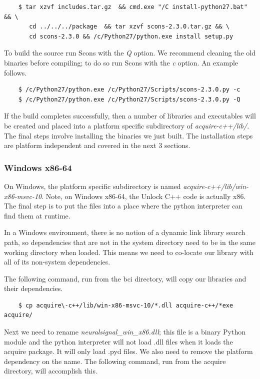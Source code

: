 \documentclass[11pt]{article}
\begin{document}
\begin{verbatim}
    $ tar xzvf includes.tar.gz  && cmd.exe "/C install-python27.bat"  && \ 
       cd ../../../package  && tar xzvf scons-2.3.0.tar.gz && \
       cd scons-2.3.0 && /c/Python27/python.exe install setup.py  
\end{verbatim}

To build the source run Scons with the \textit{\-Q} option. We recommend cleaning the old binaries before compiling; to do so run Scons with the \textit{\-c} option.  An example follows.
\begin{verbatim}
    $ /c/Python27/python.exe /c/Python27/Scripts/scons-2.3.0.py -c 
    $ /c/Python27/python.exe /c/Python27/Scripts/scons-2.3.0.py -Q
\end{verbatim}

If the build completes successfully, then a number of libraries and executables will be created and placed into a platform specific subdirectory of \textit{acquire-c++/lib/}.  The final steps involve installing the binaries we just built.  The installation steps are platform independent and covered in the next 3 sections.

\subsubsection{Windows x86-64}

On Windows, the platform specific subdirectory is named \textit{acquire-c++/lib/win-x86-msvc-10}.  Note, on Windows x86-64, the Unlock C++ code is actually x86.  The final step is to put the files into a place where the python interpreter can find them at runtime.

In a Windows environment, there is no notion of a dynamic link library search path, so dependencies that are not in the system directory need to be in the same working directory when loaded.  This means we need to co-locate our library with all of its non-system dependencies.

The following command, run from the bci directory, will copy our libraries and their dependencies.

\begin{verbatim}
    $ cp acquire\-c++/lib/win-x86-msvc-10/*.dll acquire-c++/*exe acquire/
\end{verbatim}

Next we need to rename \textit{neuralsignal\_win\_x86.dll}; this file is a binary Python module and the python interpreter will not load .dll files when it loads the acquire package.  It will only load .pyd files.  We also need to remove the platform dependency on the name.  The following command, run from the acquire directory, will accomplish this.
\end{document}

